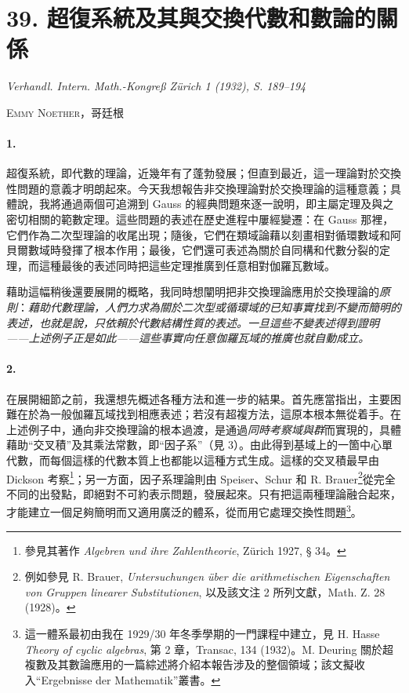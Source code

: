 \documentclass[11pt]{article}
\begin{document}
\section*{39. 超復系統及其與交換代數和數論的關係}

\begin{center}
\emph{Verhandl. Intern. Math.-Kongreß Zürich 1 (1932), S. 189--194}
\end{center}

\begin{center}
\textsc{Emmy Noether，哥廷根}
\end{center}

\paragraph{1.}
超復系統，即代數的理論，近幾年有了蓬勃發展；但直到最近，這一理論對於交換性問題的意義才明朗起來。今天我想報告非交換理論對於交換理論的這種意義；具體說，我將通過兩個可追溯到 Gauss 的經典問題來逐一說明，即主屬定理及與之密切相關的範數定理。這些問題的表述在歷史進程中屢經變遷：在 Gauss 那裡，它們作為二次型理論的收尾出現；隨後，它們在類域論藉以刻畫相對循環數域和阿貝爾數域時發揮了根本作用；最後，它們還可表述為關於自同構和代數分裂的定理，而這種最後的表述同時把這些定理推廣到任意相對伽羅瓦數域。

藉助這幅稍後還要展開的概略，我同時想闡明把非交換理論應用於交換理論的\emph{原則}：\emph{藉助代數理論，人們力求為關於二次型或循環域的已知事實找到不變而簡明的表述，也就是說，只依賴於代數結構性質的表述。一旦這些不變表述得到證明——上述例子正是如此——這些事實向任意伽羅瓦域的推廣也就自動成立。}

\paragraph{2.}
在展開細節之前，我還想先概述各種方法和進一步的結果。首先應當指出，主要困難在於為一般伽羅瓦域找到相應表述；若沒有超複方法，這原本根本無從着手。在上述例子中，通向非交換理論的根本過渡，是通過\emph{同時考察域與群}而實現的，具體藉助“交叉積”及其乘法常數，即“因子系”（見 3）。由此得到基域上的一箇中心單代數，而每個這樣的代數本質上也都能以這種方式生成。這樣的交叉積最早由 Dickson 考察\footnote{參見其著作 \emph{Algebren und ihre Zahlentheorie}, Zürich 1927, § 34。}；另一方面，因子系理論則由 Speiser、Schur 和 R. Brauer\footnote{例如參見 R. Brauer, \emph{Untersuchungen über die arithmetischen Eigenschaften von Gruppen linearer Substitutionen}, 以及該文注 2 所列文獻，Math. Z. 28 (1928)。}從完全不同的出發點，即絕對不可約表示問題，發展起來。只有把這兩種理論融合起來，才能建立一個足夠簡明而又適用廣泛的體系，從而用它處理交換性問題\footnote{這一體系最初由我在 1929/30 年冬季學期的一門課程中建立，見 H. Hasse \emph{Theory of cyclic algebras}, 第 2 章，Transac, 134 (1932)。M. Deuring 關於超複數及其數論應用的一篇綜述將介紹本報告涉及的整個領域；該文擬收入“Ergebnisse der Mathematik”叢書。}。
\end{document}
